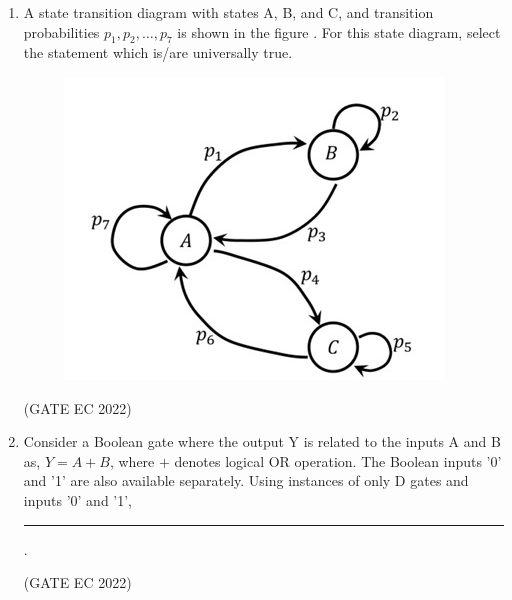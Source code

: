 \documentclass[journal,12pt,onecolumn]{IEEEtran}
\theoremstyle{remark}
\begin{document}
\begin{enumerate}
    \item A state transition diagram with states A, B, and C, and transition probabilities $p_1, p_2, \dots, p_7$ is shown in the figure  . For this state diagram, select the statement which is/are universally true.
    \begin{figure}[H]
        \centering
        \includegraphics[width=0.5\columnwidth]{figs/m23.jpg}
        \caption*{}
        \label{fig:m23}
    \end{figure}
    
    \hfill{(GATE EC 2022)}
    \begin{enumerate}
    \end{enumerate}

    \item Consider a Boolean gate  where the output Y is related to the 
    inputs A and B as, $Y = A + B$, where $+$ denotes logical OR operation. The
    Boolean inputs '0' and '1' are also available separately. Using instances of 
    only D gates and inputs '0' and '1', \rule{2cm}{0.4pt} .
    
    \hfill{(GATE EC 2022)}
    \begin{enumerate}
    \end{enumerate}


\end{enumerate}
\end{document}
